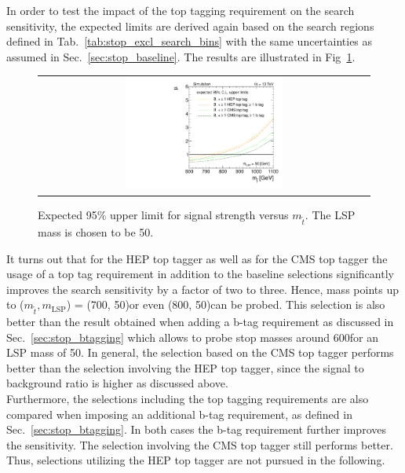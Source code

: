 In order to test the impact of the top tagging requirement on the search sensitivity, the expected limits are derived again based on the search regions defined in Tab.~\ref{tab:stop_excl_search_bins} with the same uncertainties as assumed in Sec.~\ref{sec:stop_baseline}. The results are illustrated in Fig~\ref{fig:stop_baselinetoptag_limit}. 
\begin{figure}[!t]
  \centering
  \begin{tabular}{c}
                \includegraphics[width=0.49\textwidth]{figures/limitplot4BinSel_BaselineBTagTopTag_LSP50.pdf} 
  \end{tabular}
  \caption{Expected 95\% upper limit for signal strength versus $m_{\tilde{t}}$. The LSP mass is chosen to be 50\gev.}
  \label{fig:stop_baselinetoptag_limit}
\end{figure}
It turns out that for the HEP top tagger as well as for the CMS top tagger the usage of a top tag requirement in addition to the baseline selections significantly improves the search sensitivity by a factor of two to three. Hence, mass points up to ($m_{\tilde{t}}, m_\mathrm{LSP}$) = (700, 50)\gev or even (800, 50)\gev can be probed. This selection is also better than the result obtained when adding a b-tag requirement as discussed in Sec.~\ref{sec:stop_btagging} which allows to probe stop masses around 600\gev for an LSP mass of 50\gev. In general, the selection based on the CMS top tagger performs better than the selection involving the HEP top tagger, since the signal to background ratio is higher as discussed above. \\
Furthermore, the selections including the top tagging requirements are also compared when imposing an additional b-tag requirement, as defined in Sec.~\ref{sec:stop_btagging}. In both cases the b-tag requirement further improves the sensitivity. The selection involving the CMS top tagger still performs better. Thus, selections utilizing the HEP top tagger are not pursued in the following.%

